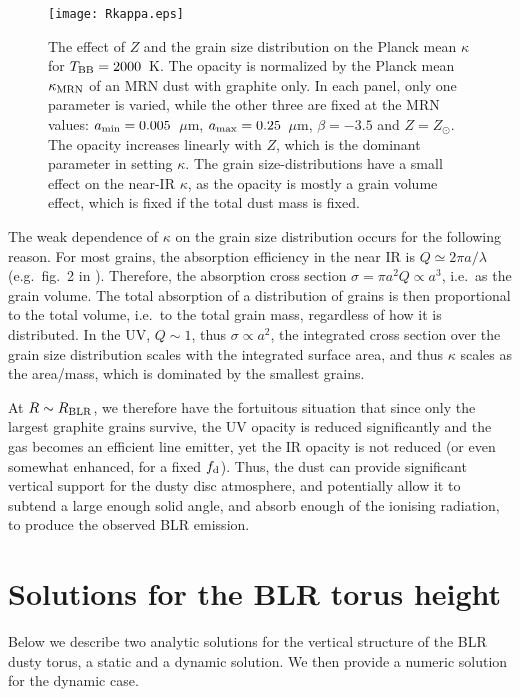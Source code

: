 \documentclass[a4paper,fleqn,usenatbib]{mnras}
\newcommand{\amin}{\mbox{$a_{\rm min}$}}
\newcommand{\amax}{\mbox{$a_{\rm max}$}}
\newcommand{\mic}{\mbox{$\mu$m}}
\begin{document}
\begin{figure*}
\texttt{[image: Rkappa.eps]}
\caption{The effect of $Z$ and the grain size distribution on the Planck mean 
$\kappa$ for $T_{\rm BB}=2000$~K. The opacity is normalized by the Planck mean $\kappa_{\rm MRN}$
of an MRN dust with graphite only.  In each panel, only one parameter is varied, while the other three are fixed at the MRN values: $\amin=0.005$~\mic, $\amax=0.25$~\mic, $\beta=-3.5$ and $Z=Z_{\odot}$.
The opacity increases linearly with $Z$, which is the dominant parameter in setting $\kappa$.
The grain size-distributions have a small effect on the near-IR $\kappa$, as the opacity is mostly
a grain volume effect, which is fixed if the total dust mass is fixed. }
\label{fig:Rkappa}
\end{figure*}


The weak dependence of $\kappa$ on the grain size distribution occurs for the following reason.
For most grains, the absorption efficiency in the near IR is $Q\simeq 2\pi a/\lambda$ (e.g.\ fig.~2 in \citealt{LaorDraine93}). 
Therefore, the absorption cross section
$\sigma=\pi a^2Q \propto a^3$, i.e.\ as the grain volume. The total absorption of a distribution of grains is then 
proportional to the total volume, i.e.\ to the total grain mass, regardless of how it is distributed. 
In the UV, $Q\sim 1$, thus $\sigma\propto a^2$, the integrated cross section over the grain size distribution
scales with the integrated surface area, and thus $\kappa$ scales as the area/mass, which 
is dominated by the smallest grains.

At $R\sim R_{\rm BLR}$, we therefore have the fortuitous situation that since only the largest graphite grains
survive, the UV opacity is reduced significantly and the gas becomes an efficient line emitter, yet the IR opacity
is not reduced (or even somewhat enhanced, for a fixed $f_{\rm d}$). Thus, the dust can provide significant 
vertical support for the dusty disc atmosphere, and potentially allow it to subtend a large enough solid angle, and absorb enough of the ionising radiation, to produce the observed BLR emission.
	
	
	
\section{Solutions for the BLR torus height}  \label{sec:solutions}
	
Below we describe two analytic solutions for the vertical structure of the BLR dusty torus, a static and a dynamic solution.
We then provide a numeric solution for the dynamic case.
\end{document}
